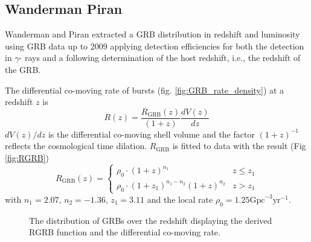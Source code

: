 \subsection{Wanderman Piran}
\label{ssec:WP}
Wanderman and Piran \cite{WP} extracted a GRB distribution in redshift and
luminosity using GRB data up to 2009 applying detection efficiencies for
both the detection in $\gamma$- rays and a following determination of the host
redshift, i.e., the redshift of the GRB. 

The differential co-moving rate of bursts (fig. \ref{fig:GRB_rate_density}) at a
redshift $z$ is
\begin{equation}
 R(z) = \frac{R_{\text{GRB}}(z)}{(1+z)} \frac{dV(z)}{dz}
 \label{eq:Rz}
\end{equation}
$dV(z)/dz$ is the differential co-moving shell volume 
and the factor $(1+z)^{-1}$ reflects the cosmological time dilation.
$R_{\text{GRB}}$ is fitted to data with the result (Fig \ref{fig:RGRB})
\begin{equation}
\label{eq:R_z}
    R_{\text{GRB}}(z) = \begin{cases}
                        \rho_0 \cdot (1 + z)^{n_1} & z \leq z_1 \\
			 \rho_0 \cdot (1 + z_1)^{n_1 - n_2}(1 + z)^{n_2} & z >
z_1
                        \end{cases}
\end{equation}
with
$n_1= 2.07$, $n_2=-1.36$, $z_1=3.11$ and the local rate $\rho_0=1.25
\text{Gpc}^{-3} \text{yr}^{-1}$.


\begin{figure}[h]
\centering
 \captionsetup{width=.9\textwidth}
\caption{The distribution of GRBs over the redshift displaying the derived RGRB 
function and the differential co-moving rate.}
\end{figure}




